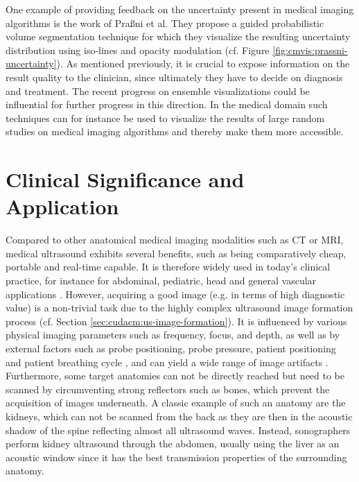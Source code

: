 One example of providing feedback on the uncertainty present in medical imaging algorithms is the work of Praßni et al.
They propose a guided probabilistic volume segmentation technique for which they visualize the resulting uncertainty distribution using iso-lines and opacity modulation (cf. Figure \ref{fig:cmvis:prassni-uncertainty}).
As mentioned previously, it is crucial to expose information on the result quality to the clinician, since ultimately they have to decide on diagnosis and treatment.
The recent progress on ensemble visualizations \cite{Hao:2016:TemporalEnsembles, Obermaier:2014:FutureEnsemble, Rautenhaus:2015:EnsembleVisualization} could be influential for further progress in this direction.
In the medical domain such techniques can for instance be used to visualize the results of large random studies on medical imaging algorithms and thereby make them more accessible.




\section{Clinical Significance and Application}
\label{sec:cmvis:clinical-significance}

Compared to other anatomical medical imaging modalities such as CT or MRI, medical ultrasound exhibits several benefits, such as being comparatively cheap, portable and real-time capable.
It is therefore widely used in today's clinical practice, for instance for abdominal, pediatric, head and general vascular applications \cite{Noble:2011:Ultrasound}. 
However, acquiring a good image (e.g. in terms of high diagnostic value) is a non-trivial task due to the highly complex ultrasound image formation process (cf. Section \ref{sec:cudacm:us-image-formation}).
It is influenced by various physical imaging parameters such as frequency, focus, and depth, as well as by external factors such as probe positioning, probe pressure, patient positioning and patient breathing cycle \cite{Aldrich:2007:USPhysics}, and can yield a wide range of image artifacts \cite{Scanlan:1991:Artifacts}.
Furthermore, some target anatomies can not be directly reached but need to be scanned by circumventing strong reflectors such as bones, which prevent the acquisition of images underneath.
A classic example of such an anatomy are the kidneys, which can not be scanned from the back as they are then in the acoustic shadow of the spine reflecting almost all ultrasound waves.
Instead, sonographers perform kidney ultrasound through the abdomen, usually using the liver as an acoustic window since it has the best transmission properties of the surrounding anatomy.

